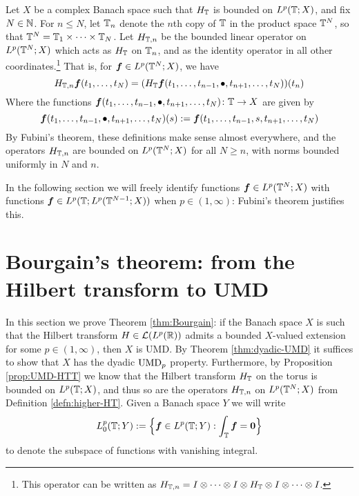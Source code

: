   \begin{defn}\label{defn:higher-HT}
    Let $X$ be a complex Banach space such that $H_{\mathbb{T}}$ is bounded on $L^p(\mathbb{T};X)$, and fix $N \in \mathbb{N}$.
    For $n \leq N$, let $\mathbb{T}_{n}$ denote the $n$th copy of $\mathbb{T}$ in the product space $\mathbb{T}^{N}$, so that $\mathbb{T}^{N} = \mathbb{T}_{1} \times \cdots \times \mathbb{T}_{N}$.
    Let $H_{\mathbb{T},n}$ be the bounded linear operator on $L^p(\mathbb{T}^{N};X)$ which acts as $H_{\mathbb{T}}$ on $\mathbb{T}_{n}$, and as the identity operator in all other coordinates.\footnote{This operator can be written as $H_{\mathbb{T},n} = I \otimes \cdots \otimes I \otimes H_{\mathbb{T}} \otimes I \otimes \cdots \otimes I$.}
    That is, for $\bm{f} \in L^p(\mathbb{T}^{N};X)$, we have
    \begin{equation*}
      H_{\mathbb{T},n}\bm{f}(t_{1}, \ldots, t_{N}) = (H_{\mathbb{T}} \bm{f}(t_{1}, \ldots, t_{n-1}, \bullet, t_{n+1}, \ldots, t_{N}))(t_{n})
    \end{equation*}
    Where the functions $\bm{f}(t_{1}, \ldots, t_{n-1}, \bullet, t_{n+1}, \ldots, t_{N}) \colon \mathbb{T} \to X$ are given by
    \begin{equation*}
      \bm{f}(t_{1}, \ldots, t_{n-1}, \bullet, t_{n+1}, \ldots, t_{N})(s) := \bm{f}(t_{1}, \ldots, t_{n-1}, s, t_{n+1}, \ldots, t_{N})
    \end{equation*}
    By Fubini's theorem, these definitions make sense almost everywhere, and the operators $H_{\mathbb{T},n}$ are bounded on $L^p(\mathbb{T}^{N};X)$ for all $N \geq n$, with norms bounded uniformly in $N$ and $n$.
  \end{defn}

  In the following section we will freely identify functions $\bm{f} \in L^p(\mathbb{T}^{N};X)$ with functions $\bm{f} \in L^p(\mathbb{T} ; L^p(\mathbb{T}^{N-1};X))$ when $p \in (1,\infty)$: Fubini's theorem justifies this.


\section{Bourgain's theorem: from the Hilbert transform to UMD}

In this section we prove Theorem \ref{thm:Bourgain}: if the Banach space $X$ is such that the Hilbert transform $H \in \mathcal{L}(L^p(\mathbb{R}))$ admits a bounded $X$-valued extension for some $p \in (1,\infty)$, then $X$ is UMD.
By Theorem \ref{thm:dyadic-UMD} it suffices to show that $X$ has the dyadic $\mathrm{UMD}_{p}$ property.
Furthermore, by Proposition \ref{prop:UMD-HTT} we know that the Hilbert transform $H_{\mathbb{T}}$ on the torus is bounded on $L^p(\mathbb{T};X)$, and thus so are the operators $H_{\mathbb{T},n}$ on $L^p(\mathbb{T}^{N};X)$ from Definition \ref{defn:higher-HT}.
Given a Banach space $Y$ we will write
\begin{equation*}
  L^p_{0}(\mathbb{T};Y) := \Big\{\bm{f} \in L^p(\mathbb{T};Y) : \int_{\mathbb{T}} \bm{f} = \bm{0} \Big\}
\end{equation*}
to denote the subspace of functions with vanishing integral.


